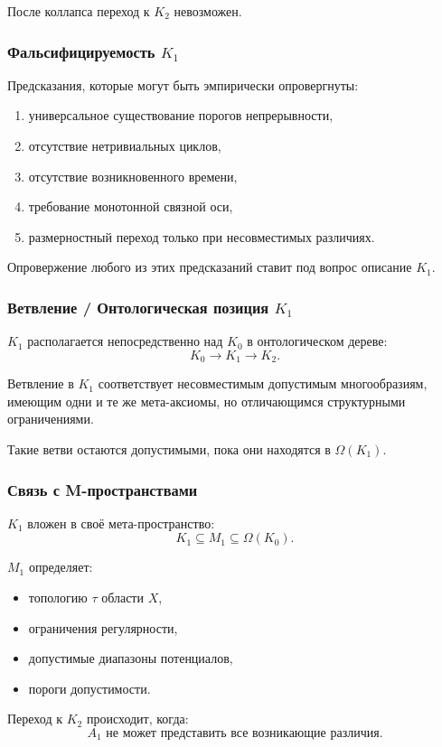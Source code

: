 После коллапса переход к $K_2$ невозможен.

\subsubsection{Фальсифицируемость \texorpdfstring{$K_1$}{K_1}}

Предсказания, которые могут быть эмпирически опровергнуты:
\begin{enumerate}
    \item универсальное существование порогов непрерывности,
    \item отсутствие нетривиальных циклов,
    \item отсутствие возникновенного времени,
    \item требование монотонной связной оси,
    \item размерностный переход только при несовместимых различиях.
\end{enumerate}

Опровержение любого из этих предсказаний ставит под вопрос описание $K_1$.

\subsubsection{Ветвление / Онтологическая позиция \texorpdfstring{$K_1$}{K_1}}

$K_1$ располагается непосредственно над $K_0$ в онтологическом дереве:
\[
K_0 \to K_1 \to K_2.
\]

Ветвление в $K_1$ соответствует несовместимым допустимым многообразиям,
имеющим одни и те же мета-аксиомы, но отличающимся структурными
ограничениями.

Такие ветви остаются допустимыми, пока они находятся в $\Omega(K_1)$.

\subsubsection{Связь с M-пространствами}

$K_1$ вложен в своё мета-пространство:
\[
K_1 \subseteq M_1 \subseteq \Omega(K_0).
\]

$M_1$ определяет:
\begin{itemize}
    \item топологию $\tau$ области $X$,
    \item ограничения регулярности,
    \item допустимые диапазоны потенциалов,
    \item пороги допустимости.
\end{itemize}

Переход к $K_2$ происходит, когда:
\[
A_1 \text{ не может представить все возникающие различия.}
\]
